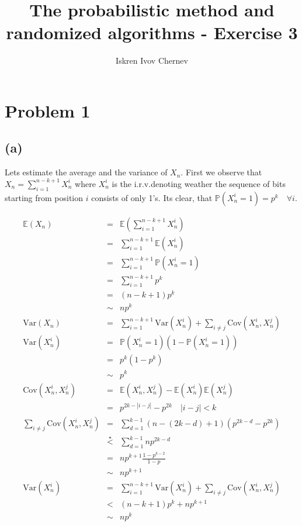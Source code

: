 \documentclass[a4paper]{article}
\begin{document}
\title{The probabilistic method and randomized algorithms - Exercise 3}
\author{Iskren Ivov Chernev}
\maketitle

\def\sm{\mathrm{sm}}
\def\P{\mathbb{P}}
\def\E{\mathbb{E}}
\def\irv{i.r.v.\;}
\def\rv{r.v.\;}
\def\FMM{F.M.M.\;}
\def\endproof{$\square$}
\def\Var{\mathrm{Var}}
\def\Cov{\mathrm{Cov}}
\def\CS{\mathrm{CS}}
\def\CCS{\mathrm{CCS}}
\newcommand{\bfrac}[2] {\left(\frac{#1}{#2}\right)}
\newcommand{\B}[1] {\left(#1\right)}

\section*{Problem 1}

\subsection*{(a)}

Lets estimate the average and the variance of $ X_n $. First we observe that
$ X_n = \sum_{i=1}^{n-k+1} X_n^i $ where $ X_n^i $ is the \irv denoting weather
the sequence of bits starting from position $ i $ consists of only 1's. Its
clear, that $ \P(X_n^i = 1) = p^k \quad \forall i $.

\begin{eqnarray*}
\E(X_n)
  &=& \E\B{\sum_{i=1}^{n-k+1} X_n^i} \\
  &=& \sum_{i=1}^{n-k+1} \E(X_n^i) \\
  &=& \sum_{i=1}^{n-k+1} \P(X_n^i = 1) \\
  &=& \sum_{i=1}^{n-k+1} p^k \\
  &=& (n-k+1)p^k \\
  &\sim& np^k \\
\Var(X_n)
  &=& \sum_{i=1}^{n-k+1} \Var(X_n^i) + \sum_{i\neq j} \Cov(X_n^i, X_n^j) \\
\Var(X_n^i)
  &=& \P(X_n^i = 1)(1 - \P(X_n^i = 1)) \\
  &=& p^k(1 - p^k) \\
  &\sim& p^k \\
\Cov(X_n^i, X_n^j)
  &=& \E(X_n^i, X_n^j) - \E(X_n^i)\E(X_n^j) \\
  &=& p^{2k - |i-j|} - p^{2k} \quad |i-j| < k \\
\sum_{i \neq j} \Cov(X_n^i, X_n^j)
  &=& \sum_{d = 1}^{k-1} (n - (2k - d) + 1) (p^{2k - d} - p^{2k}) \\
  &\overset{\star}{<}& \sum_{d = 1}^{k-1} n p^{2k - d} \\
  &=& np^{k+1}\frac{1 - p^{k-2}}{1 - p} \\
  &\sim& np^{k+1} \\
\Var(X_n^i)
  &=& \sum_{i=1}^{n-k+1} \Var(X_n^i) + \sum_{i\neq j} \Cov(X_n^i, X_n^j) \\
  &<& (n-k+1)p^k + np^{k+1} \\
  &\sim& np^k
\end{eqnarray*}
\end{document}
